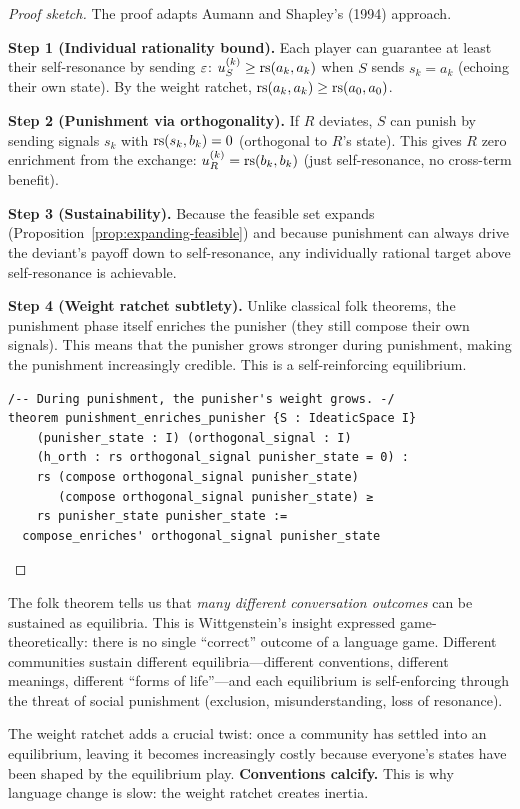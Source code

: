 \begin{proof}[Proof sketch]
The proof adapts Aumann and Shapley's (1994) approach.

\textbf{Step 1 (Individual rationality bound).}
Each player can guarantee at least their self-resonance by sending $\varepsilon$:
$u_S^{(k)} \geq \mathrm{rs}(a_k, a_k)$ when $S$ sends $s_k = a_k$ (echoing their
own state).  By the weight ratchet, $\mathrm{rs}(a_k, a_k) \geq \mathrm{rs}(a_0, a_0)$.

\textbf{Step 2 (Punishment via orthogonality).}
If $R$ deviates, $S$ can punish by sending signals $s_k$ with
$\mathrm{rs}(s_k, b_k) = 0$ (orthogonal to $R$'s state).  This gives $R$ zero
enrichment from the exchange: $u_R^{(k)} = \mathrm{rs}(b_k, b_k)$ (just
self-resonance, no cross-term benefit).

\textbf{Step 3 (Sustainability).}
Because the feasible set expands (Proposition~\ref{prop:expanding-feasible})
and because punishment can always drive the deviant's payoff down to
self-resonance, any individually rational target above self-resonance is
achievable.

\textbf{Step 4 (Weight ratchet subtlety).}
Unlike classical folk theorems, the punishment phase itself enriches the
punisher (they still compose their own signals).  This means that the punisher
grows stronger during punishment, making the punishment increasingly credible.
This is a self-reinforcing equilibrium.

\begin{lstlisting}[caption={Lean 4: Folk theorem — punishment credibility}]
/-- During punishment, the punisher's weight grows. -/
theorem punishment_enriches_punisher {S : IdeaticSpace I}
    (punisher_state : I) (orthogonal_signal : I)
    (h_orth : rs orthogonal_signal punisher_state = 0) :
    rs (compose orthogonal_signal punisher_state)
       (compose orthogonal_signal punisher_state) ≥
    rs punisher_state punisher_state :=
  compose_enriches' orthogonal_signal punisher_state
\end{lstlisting}
\end{proof}

\begin{interpretation}
\label{interp:many-equilibria}
The folk theorem tells us that \emph{many different conversation outcomes} can
be sustained as equilibria.  This is Wittgenstein's insight expressed
game-theoretically: there is no single ``correct'' outcome of a language
game.  Different communities sustain different equilibria---different
conventions, different meanings, different ``forms of life''---and each
equilibrium is self-enforcing through the threat of social punishment
(exclusion, misunderstanding, loss of resonance).

The weight ratchet adds a crucial twist: once a community has settled into
an equilibrium, leaving it becomes increasingly costly because everyone's
states have been shaped by the equilibrium play.  \textbf{Conventions calcify.}
This is why language change is slow: the weight ratchet creates inertia.
\end{interpretation}


